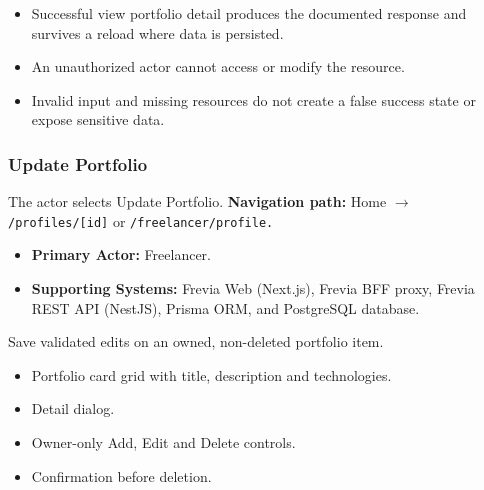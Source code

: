 \begin{itemize}[leftmargin=1.6em,topsep=3pt,itemsep=2pt,parsep=0pt,label=$\bullet$]
    \item Successful view portfolio detail produces the documented response and survives a reload where data is persisted.
    \item An unauthorized actor cannot access or modify the resource.
    \item Invalid input and missing resources do not create a false success state or expose sensitive data.
\end{itemize}

\subsubsection{Update Portfolio}

The actor selects Update Portfolio.\newline
\textbf{Navigation path:} Home $\rightarrow$ \texttt{/\allowbreak{}profiles/\allowbreak{}[id]} or \texttt{/\allowbreak{}freelancer/\allowbreak{}profile.}


\begin{itemize}[leftmargin=1.6em,topsep=3pt,itemsep=2pt,parsep=0pt,label=$\bullet$]
    \item \textbf{Primary Actor:} Freelancer.
    \item \textbf{Supporting Systems:} Frevia Web (Next.js), Frevia BFF proxy, Frevia REST API (NestJS), Prisma ORM, and PostgreSQL database.
\end{itemize}

\noindent Save validated edits on an owned, non-deleted portfolio item.

\begin{itemize}[leftmargin=1.6em,topsep=3pt,itemsep=2pt,parsep=0pt,label=$\bullet$]
    \item Portfolio card grid with title, description and technologies.
    \item Detail dialog.
    \item Owner-only Add, Edit and Delete controls.
    \item Confirmation before deletion.
\end{itemize}

